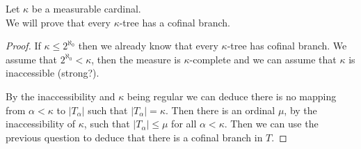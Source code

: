 \question{}
Let $\kappa$ be a measurable cardinal. \\
We will prove that every $\kappa$-tree has a cofinal branch.
\begin{proof}
	If $\kappa \le 2^{\aleph_0}$ then we already know that every $\kappa$-tree has cofinal branch.
	We assume that $2^{\aleph_0} < \kappa$, then the measure is $\kappa$-complete and we can assume that $\kappa$ is inaccessible (strong?).

	By the inaccessibility and $\kappa$ being regular we can deduce there is no mapping from $\alpha < \kappa$ to $|T_\alpha|$ such that $|T_\alpha| = \kappa$.
	Then there is an ordinal $\mu$, by the inaccessibility of $\kappa$, such that $|T_\alpha| \le \mu$ for all $\alpha < \kappa$.
	Then we can use the previous question to deduce that there is a cofinal branch in $T$.
\end{proof}


